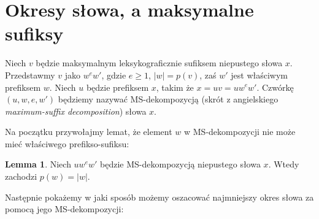 \documentclass[a4paper,11pt]{article}
\theoremstyle{definition}
\newtheorem{lemma}{Lemma}[section]
\begin{document}
\section{Okresy słowa, a maksymalne sufiksy}
Niech $v$ będzie maksymalnym leksykograficznie sufiksem niepustego słowa $x$. Przedstawmy $v$ jako $w^ew'$, gdzie $e \geq 1$, $|w| = p(v)$, zaś $w'$ jest właściwym prefiksem $w$. Niech $u$ będzie prefiksem $x$, takim że $x = uv = uw^ew'$. Czwórkę $(u, w, e, w')$ będziemy nazywać MS-dekompozycją (skrót z angielskiego \textit{maximum-suffix decomposition}) słowa $x$.
\par
Na początku przywołajmy lemat, że element $w$ w MS-dekompozycji nie może mieć właściwego prefikso-sufiksu:
\begin{lemma}\label{lem:w_is_borderless}
Niech $uw^ew'$ będzie MS-dekompozycją niepustego słowa $x$. Wtedy zachodzi $p(w) = |w|$.
\end{lemma}
\par
Następnie pokażemy w jaki sposób możemy oszacować najmniejszy okres słowa za pomocą jego MS-dekompozycji:
\end{document}
